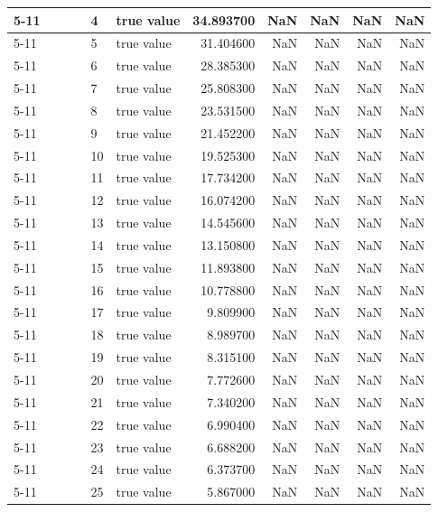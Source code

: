 \begin{tabular}{llllllrrrrr}
\cline{5-11}
 &  &  &  & 4 & true value & 34.893700 & NaN & NaN & NaN & NaN \\
\cline{5-11}
 &  &  &  & 5 & true value & 31.404600 & NaN & NaN & NaN & NaN \\
\cline{5-11}
 &  &  &  & 6 & true value & 28.385300 & NaN & NaN & NaN & NaN \\
\cline{5-11}
 &  &  &  & 7 & true value & 25.808300 & NaN & NaN & NaN & NaN \\
\cline{5-11}
 &  &  &  & 8 & true value & 23.531500 & NaN & NaN & NaN & NaN \\
\cline{5-11}
 &  &  &  & 9 & true value & 21.452200 & NaN & NaN & NaN & NaN \\
\cline{5-11}
 &  &  &  & 10 & true value & 19.525300 & NaN & NaN & NaN & NaN \\
\cline{5-11}
 &  &  &  & 11 & true value & 17.734200 & NaN & NaN & NaN & NaN \\
\cline{5-11}
 &  &  &  & 12 & true value & 16.074200 & NaN & NaN & NaN & NaN \\
\cline{5-11}
 &  &  &  & 13 & true value & 14.545600 & NaN & NaN & NaN & NaN \\
\cline{5-11}
 &  &  &  & 14 & true value & 13.150800 & NaN & NaN & NaN & NaN \\
\cline{5-11}
 &  &  &  & 15 & true value & 11.893800 & NaN & NaN & NaN & NaN \\
\cline{5-11}
 &  &  &  & 16 & true value & 10.778800 & NaN & NaN & NaN & NaN \\
\cline{5-11}
 &  &  &  & 17 & true value & 9.809900 & NaN & NaN & NaN & NaN \\
\cline{5-11}
 &  &  &  & 18 & true value & 8.989700 & NaN & NaN & NaN & NaN \\
\cline{5-11}
 &  &  &  & 19 & true value & 8.315100 & NaN & NaN & NaN & NaN \\
\cline{5-11}
 &  &  &  & 20 & true value & 7.772600 & NaN & NaN & NaN & NaN \\
\cline{5-11}
 &  &  &  & 21 & true value & 7.340200 & NaN & NaN & NaN & NaN \\
\cline{5-11}
 &  &  &  & 22 & true value & 6.990400 & NaN & NaN & NaN & NaN \\
\cline{5-11}
 &  &  &  & 23 & true value & 6.688200 & NaN & NaN & NaN & NaN \\
\cline{5-11}
 &  &  &  & 24 & true value & 6.373700 & NaN & NaN & NaN & NaN \\
\cline{5-11}
 &  &  &  & 25 & true value & 5.867000 & NaN & NaN & NaN & NaN \\

\end{tabular}
